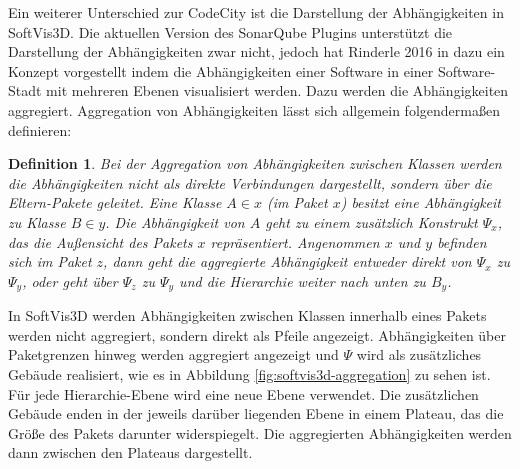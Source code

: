 Ein weiterer Unterschied zur CodeCity ist die Darstellung der Abhängigkeiten in SoftVis3D. Die aktuellen Version des SonarQube Plugins unterstützt die Darstellung der Abhängigkeiten zwar nicht, jedoch hat Rinderle 2016 in \cite{rinderle2016kontinuierliche} dazu ein Konzept vorgestellt indem die Abhängigkeiten einer Software in einer Software-Stadt mit mehreren Ebenen visualisiert werden. Dazu werden die Abhängigkeiten aggregiert. Aggregation von Abhängigkeiten lässt sich allgemein folgendermaßen definieren:

\newtheorem{aggregation}{Definition}[section]
\begin{aggregation}\label{def:aggregation}
Bei der Aggregation von Abhängigkeiten zwischen Klassen werden die Abhängigkeiten nicht als direkte Verbindungen dargestellt, sondern über die Eltern-Pakete geleitet. Eine Klasse $A \in x$ (im Paket $x$) besitzt eine Abhängigkeit zu Klasse $B \in y$. Die Abhängigkeit von $A$ geht zu einem zusätzlich Konstrukt $\Psi_x$, das die Außensicht des Pakets $x$ repräsentiert. Angenommen $x$ und $y$ befinden sich im Paket $z$, dann geht die aggregierte Abhängigkeit entweder direkt von $\Psi_x$ zu $\Psi_y$, oder geht über $\Psi_z$ zu $\Psi_y$ und die Hierarchie weiter nach unten zu $B_y$.
\end{aggregation}

In SoftVis3D werden Abhängigkeiten zwischen Klassen innerhalb eines Pakets werden nicht aggregiert, sondern direkt als Pfeile angezeigt. Abhängigkeiten über Paketgrenzen hinweg werden aggregiert angezeigt und $\Psi$ wird als zusätzliches Gebäude realisiert, wie es in Abbildung \ref{fig:softvis3d-aggregation} zu sehen ist. Für jede Hierarchie-Ebene wird eine neue Ebene verwendet. Die zusätzlichen Gebäude enden in der jeweils darüber liegenden Ebene in einem Plateau, das die Größe des Pakets darunter widerspiegelt. Die aggregierten Abhängigkeiten werden dann zwischen den Plateaus dargestellt.

